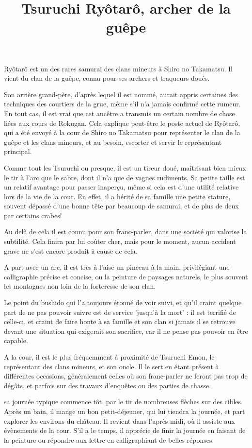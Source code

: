 \documentclass[10pt,a4paper]{article}
\title{Tsuruchi Ryôtarô, archer de la guêpe}
\author{}
\date{}
\begin{document}
\maketitle

Ryôtarô est un des rares samurai des clans mineurs à Shiro no Takamatsu. Il vient du clan de la guêpe, connu pour ses archers et traqueurs doués.

Son arrière grand-père, d'après lequel il est nommé, aurait appris certaines des techniques des courtiers de la grue, même s'il n'a jamais confirmé cette rumeur. En tout cas, il est vrai que cet ancêtre a transmis un certain nombre de chose liées aux cours de Rokugan. Cela explique peut-être le poste actuel de Ryôtarô, qui a été envoyé à la cour de Shiro no Takamatsu pour représenter le clan de la guêpe et les clans mineurs, et au besoin, escorter et servir le représentant principal.

Comme tout les Tsuruchi ou presque, il est un tireur doué, maîtrisant bien mieux le tir à l'arc que le sabre, dont il n'a que de vagues rudiments. Sa petite taille est un relatif avantage pour passer inaperçu, même si cela est d'une utilité relative lors de la vie de la cour. En effet, il a hérité de sa famille une petite stature, souvent dépassé d'une bonne tête par beaucoup de samurai, et de plus de deux par certains crabes!

Au delà de cela il est connu pour son franc-parler, dans une société qui valorise la subtilité. Cela finira par lui coûter cher, mais pour le moment, aucun accident grave ne s'est encore produit à cause de cela.

A part avec un arc, il est très à l'aise un pinceau à la main, privilégiant une calligraphie précise et concise, ou la peinture de paysages naturels, le plus souvent les montagnes non loin de la forteresse de son clan.

Le point du bushido qui l'a toujours étonné de voir suivi, et qu'il craint quelque part de ne pas pouvoir suivre est de service 'jusqu'à la mort' : il est terrifié de celle-ci, et craint de faire honte à sa famille et son clan si jamais il se retrouve devant une situation qui exigerait son sacrifice, car il ne pense pas pouvoir en être capable.

A la cour, il est le plus fréquemment à proximité de Tsuruchi Emon, le représentant des clans mineurs, et son oncle. Il le sert en étant présent à différentes occasions, généralement celles où son franc-parler ne feront pas trop de dégâts, et parfois sur des travaux d'enquêtes ou des parties de chasse.

sa journée typique commence tôt, par le tir de nombreuses flèches sur des cibles. Après un bain, il mange un bon petit-déjeuner, qui lui tiendra la journée, et part explorer les environs du château. Il revient dans l'après-midi, où il assiste aux évènements de la cour. S'il a le temps, il apprécie de finir la journée en faisant de la peinture ou répondre aux lettre en calligraphiant de belles réponses.
\end{document}
